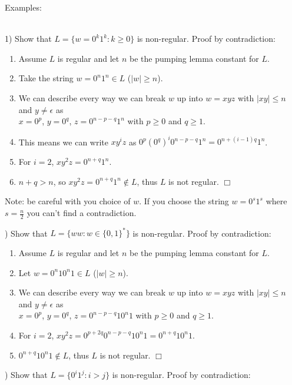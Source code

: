 \documentclass[12pt]{article}
\begin{document}
\noindent
Examples:

\noindent
\\
1) Show that $L = \{w = 0^k 1^k : k \geq 0\}$ is non-regular.
Proof by contradiction:

\begin{enumerate}
    \item Assume $L$ is regular and let $n$ be the pumping lemma constant for $L$.
    \item Take the string $w = 0^n 1^n \in L$ ($|w| \geq n$).
    \item We can describe every way we can break $w$ up into $w = xyz$ with $|xy| \leq n$ and $y \neq \epsilon$ as\\$x = 0^p$, $y = 0^q$, $z = 0^{n - p - q}1^n$ with $p \geq 0$ and $q \geq 1$.
    \item This means we can write $xy^iz$ as $0^p \left(0^q\right)^i 0^{n - p - q} 1^n = 0^{n + (i - 1)q} 1^n$.
    \item For $i = 2$, $xy^2z = 0^{n + q} 1^n$.
    \item $n + q > n$, so $xy^2z = 0^{n + q} 1^n \notin L$, thus $L$ is not regular. $\Box$
\end{enumerate}

\noindent
Note: be careful with you choice of $w$.
If you choose the string $w = 0^s 1^s$ where $s = \frac{n}{2}$ you can't find a contradiction.

\newpage
{}) Show that $L = \{ww : w \in \{0, 1\}^*\}$ is non-regular.
Proof by contradiction:

\begin{enumerate}
    \item Assume $L$ is regular and let $n$ be the pumping lemma constant for $L$.
    \item Let $w = 0^n 10^n1 \in L$ ($|w| \geq n$).
    \item We can describe every way we can break $w$ up into $w = xyz$ with $|xy| \leq n$ and $y \neq \epsilon$ as\\$x = 0^p$, $y = 0^q$, $z = 0^{n - p - q}10^n1$ with $p \geq 0$ and $q \geq 1$.
    \item For $i = 2$, $xy^2z = 0^{p + 2q}0^{n - p - q}10^n1 = 0^{n + q}10^{n}1$.
    \item $0^{n + q}10^{n}1 \notin L$, thus $L$ is not regular. $\Box$
\end{enumerate}

) Show that $L = \{0^i 1^j : i > j\}$ is non-regular.
Proof by contradiction:
\end{document}
